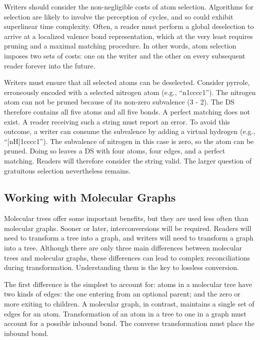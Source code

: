 \documentclass{article}
\begin{document}
Writers should consider the non-negligible costs of atom selection. Algorithms for selection are likely to involve the perception of cycles, and so could exhibit superlinear time complexity. Often, a reader must perform a global deselection to arrive at a localized valence bond representation, which at the very least requires pruning and a maximal matching procedure. In other words, atom selection imposes two sets of costs: one on the writer and the other on every subsequent reader forever into the future.

Writers must ensure that all selected atoms can be deselected. Consider pyrrole, erroneously encoded with a selected nitrogen atom (e.g., \enquote{n1cccc1}). The nitrogen atom can not be pruned because of its non-zero subvalence (3 - 2). The DS therefore contains all five atoms and all five bonds. A perfect matching does not exist. A reader receiving such a string must report an error. To avoid this outcome, a writer can consume the subvalence by adding a virtual hydrogen (e.g., \enquote{[nH]1cccc1}). The subvalence of nitrogen in this case is zero, so the atom can be pruned. Doing so leaves a DS with four atoms, four edges, and a perfect matching. Readers will therefore consider the string valid. The larger question of gratuitous selection nevertheless remains.

\subsection*{Working with Molecular Graphs}
\label{working-with-molecular-graphs}

Molecular trees offer some important benefits, but they are used less often than molecular graphs. Sooner or later, interconversions will be required. Readers will need to transform a tree into a graph, and writers will need to transform a graph into a tree. Although there are only three main differences between molecular trees and molecular graphs, these differences can lead to complex reconciliations during transformation. Understanding them is the key to lossless conversion.

The first difference is the simplest to account for: atoms in a molecular tree have two kinds of edges: the one entering from an optional parent; and the zero or more exiting to children. A molecular graph, in contrast, maintains a single set of edges for an atom. Transformation of an atom in a tree to one in a graph must account for a possible inbound bond. The converse transformation must place the inbound bond.
\end{document}
